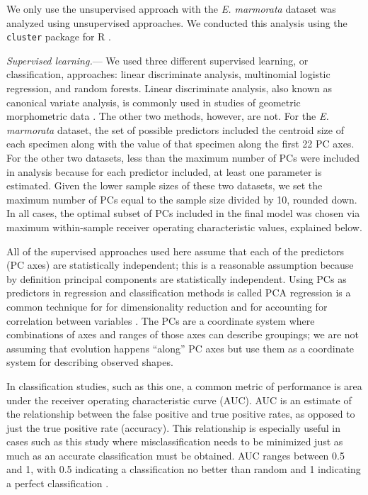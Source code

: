 \documentclass[12pt,letterpaper]{article}
\renewcommand{\subsubsection}[1]{%
\vspace{2ex}
\noindent
\textit{#1.}---}
\begin{document}
We only use the unsupervised approach with the \textit{E. marmorata} dataset was analyzed using unsupervised approaches. We conducted this analysis using the \texttt{cluster} package for R \citep{Maechler2013}.

\subsubsection{Supervised learning}
We used three different supervised learning, or classification, approaches: linear discriminate analysis, multinomial logistic regression, and random forests. Linear discriminate analysis, also known as canonical variate analysis, is commonly used in studies of geometric morphometric data \citep{Zelditch2004,Claude2008,Mitteroecker2011}. The other two methods, however, are not. For the \textit{E. marmorata} dataset, the set of possible predictors included the centroid size of each specimen along with the value of that specimen along the first 22 PC axes. For the other two datasets, less than the maximum number of PCs were included in analysis because for each predictor included, at least one parameter is estimated. Given the lower sample sizes of these two datasets, we set the maximum number of PCs equal to the sample size divided by 10, rounded down. In all cases, the optimal subset of PCs included in the final model was chosen via maximum within-sample receiver operating characteristic values, explained below. 

All of the supervised approaches used here assume that each of the predictors (PC axes) are statistically independent; this is a reasonable assumption because by definition principal components are statistically independent. Using PCs as predictors in regression and classification methods is called PCA regression is a common technique for for dimensionality reduction and for accounting for correlation between variables \citep{Hastie2009}. The PCs are a coordinate system where combinations of axes and ranges of those axes can describe groupings; we are not assuming that evolution happens ``along'' PC axes \citep{Uyeda2015} but use them as a coordinate system for describing observed shapes.

In classification studies, such as this one, a common metric of performance is area under the receiver operating characteristic curve (AUC). AUC is an estimate of the relationship between the false positive and true positive rates, as opposed to just the true positive rate (accuracy). This relationship is especially useful in cases such as this study where misclassification needs to be minimized just as much as an accurate classification must be obtained. AUC ranges between 0.5 and 1, with 0.5 indicating a classification no better than random and 1 indicating a perfect classification \citep{Hastie2009}.
\end{document}
